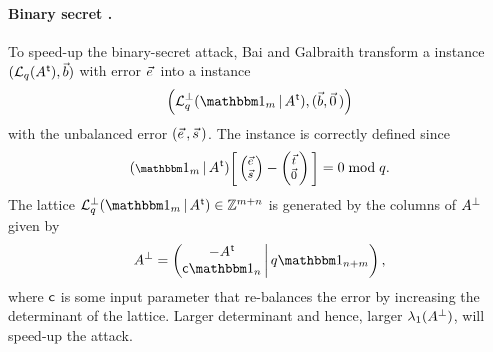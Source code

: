 \paragraph{Binary secret \LWE.} To speed-up the binary-secret \LWE attack, Bai and Galbraith transform a \BDD instance $(\mathcal{L}_q(A\mkern0.7mu^{\mathsf{ t}}), \vec b)$ with error $\evec$ into a \BDD instance
\begin{equation} \label{eq:binLWEBDDInstance}
 \left( \qLATTp( \Id_m \, | \, \AMat\transpose), (\bvec, \zerovec) \right)
\end{equation}
with the unbalanced error $(\evec, \svec)$. The instance is correctly defined since
\[
	\footnotesize\arraycolsep=0.8\arraycolsep
	( \Id_m \, | \, \AMat\transpose) \Bigg[ \begin{pmatrix}  \evec \\ \svec \end{pmatrix} - \begin{pmatrix}  \tvec \\ \zerovec \end{pmatrix} \Bigg] = 0 \bmod q.
\]
The lattice $\qLATTp( \Id_m \, | \, \AMat\transpose) \in \Z^{m+n}$ is generated by the columns of $A^{\perp}$ given by
\[
	\AMat^{\perp} = \left(
	\begin{matrix}
	-\AMat\transpose \\
	\const \Id_n \\
	\end{matrix}
	\, \middle\vert \,
	q\Id_{n+m}
	\right),	
\]
where $\mathsf{c}$ is some input parameter that re-balances the error by increasing the determinant of the lattice. Larger determinant and hence, larger $\lambda_1(A^{\perp})$, will speed-up the \BDD attack.

